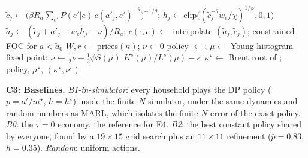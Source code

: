 \documentclass{article}
\begin{document}
\begin{algorithm}[t]
\caption{B1: stationary equilibrium with endogenous labor (EGM + histogram + Brent)}\label{alg:b1}
\small
\begin{algorithmic}[1]
 
\Repeat
  \State $\tilde c_j\gets\big(\beta R_a\sum_{e'}P(e'|e)\,c(a'_j,e')^{-\theta}\big)^{-1/\theta}$;\; $\tilde h_j\gets\mathrm{clip}\big((\tilde c_j^{-\theta}w_e/\chi)^{1/\varphi},0,1\big)$
  \State $\tilde a_j\gets(\tilde c_j+a'_j-w_e\tilde h_j-\nu)/R_a$;\; $c(\cdot,e)\gets$ interpolate $(\tilde a_j,\tilde c_j)$; constrained FOC for $a<\tilde a_0$
\EndFunction
{}
  \State $W,r\gets$ prices$(\kappa)$;\; $\nu\gets0$
  \Repeat\; policy $\gets$;\; $\mu\gets$ Young histogram fixed point;\; $\nu\gets\frac12\nu+\frac12\psi S(\mu)$
  \State \Return $K^s(\mu)/L^s(\mu)-\kappa$
\EndFunction
\State $\kappa^\star\gets$ Brent root of ;\; \Return policy, $\mu^\star$, $(\kappa^\star,\nu^\star)$
\end{algorithmic}
\end{algorithm}

\textbf{C3: Baselines.} \emph{B1-in-simulator}: every household plays the DP policy ($p=a'/m^\star$, $h=h^\star$) inside the finite-$N$ simulator, under the same dynamics and random numbers as MARL, which isolates the finite-$N$ error of the exact policy. \emph{B0}: the $\tau=0$ economy, the reference for E4. \emph{B2}: the best constant policy shared by everyone, found by a $19\times15$ grid search plus an $11\times11$ refinement ($\bar p=0.83$, $\bar h=0.35$). \emph{Random}: uniform actions.
\end{document}
